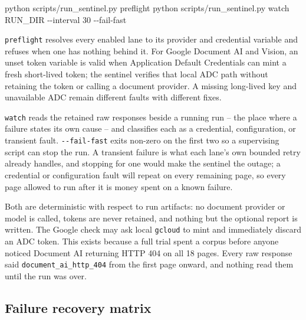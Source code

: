 \documentclass[
]{article}
\newenvironment{Shaded}{}{}
\newcommand{\AttributeTok}[1]{\textcolor[rgb]{0.49,0.56,0.16}{#1}}
\newcommand{\ExtensionTok}[1]{#1}
\newcommand{\NormalTok}[1]{#1}
\begin{document}
\begin{Shaded}
\begin{Highlighting}[]
\ExtensionTok{python}\NormalTok{ scripts/run\_sentinel.py preflight}
\ExtensionTok{python}\NormalTok{ scripts/run\_sentinel.py watch RUN\_DIR }\AttributeTok{{-}{-}interval}\NormalTok{ 30 }\AttributeTok{{-}{-}fail{-}fast}
\end{Highlighting}
\end{Shaded}

\texttt{preflight} resolves every enabled lane to its provider and
credential variable and refuses when one has nothing behind it. For
Google Document AI and Vision, an unset token variable is valid when
Application Default Credentials can mint a fresh short-lived token; the
sentinel verifies that local ADC path without retaining the token or
calling a document provider. A missing long-lived key and unavailable
ADC remain different faults with different fixes.

\texttt{watch} reads the retained raw responses beside a running run --
the place where a failure states its own cause -- and classifies each as
a credential, configuration, or transient fault. \texttt{-\/-fail-fast}
exits non-zero on the first two so a supervising script can stop the
run. A transient failure is what each lane's own bounded retry already
handles, and stopping for one would make the sentinel the outage; a
credential or configuration fault will repeat on every remaining page,
so every page allowed to run after it is money spent on a known failure.

Both are deterministic with respect to run artifacts: no document
provider or model is called, tokens are never retained, and nothing but
the optional report is written. The Google check may ask local
\texttt{gcloud} to mint and immediately discard an ADC token. This
exists because a full trial spent a corpus before anyone noticed
Document AI returning HTTP 404 on all 18 pages. Every raw response said
\texttt{document\_\allowbreak{}ai\_\allowbreak{}http\_\allowbreak{}404}
from the first page onward, and nothing read them until the run was
over.

\subsection{Failure recovery matrix}\label{failure-recovery-matrix}
\end{document}
